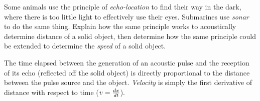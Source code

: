

Some animals use the principle of {\it echo-location} to find their way in the dark, where there is too little light to effectively use their eyes.  Submarines use {\it sonar} to do the same thing.  Explain how the same principle works to acoustically determine distance of a solid object, then determine how the same principle could be extended to determine the {\it speed} of a solid object.







The time elapsed between the generation of an acoustic pulse and the reception of its echo (reflected off the solid object) is directly proportional to the distance between the pulse source and the object.  {\it Velocity} is simply the first derivative of distance with respect to time ($v = {dx \over dt}$).











